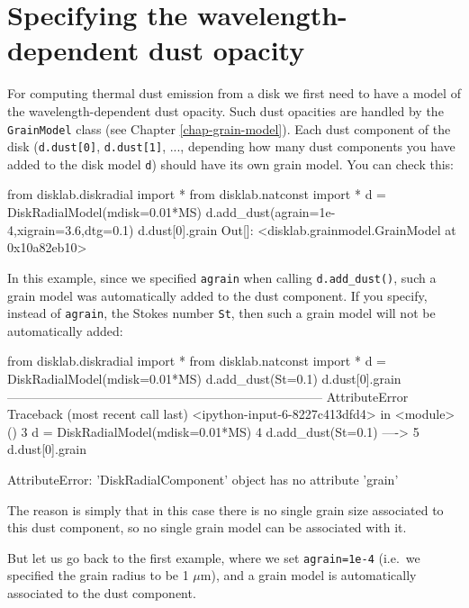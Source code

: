 \documentclass{book}
\newcommand{\code}[1]{{\small\tt #1}}
\begin{document}
\section{Specifying the wavelength-dependent dust opacity}
\label{sec-simple-dust-opacity}
For computing thermal dust emission from a disk we first need to have a model
of the wavelength-dependent dust opacity. Such dust opacities are handled by
the \code{GrainModel} class (see Chapter \ref{chap-grain-model}). Each dust
component of the disk (\code{d.dust[0]}, \code{d.dust[1]}, ..., depending how
many dust components you have added to the disk model \code{d}) should have
its own grain model. You can check this:
\begin{codebox}
from disklab.diskradial import *
from disklab.natconst import *
d = DiskRadialModel(mdisk=0.01*MS)
d.add_dust(agrain=1e-4,xigrain=3.6,dtg=0.1)
d.dust[0].grain
Out[]: <disklab.grainmodel.GrainModel at 0x10a82eb10>
\end{codebox}
In this example, since we specified \code{agrain} when calling
\code{d.add\_dust()}, such a grain model was automatically added to the dust
component. If you specify, instead of \code{agrain}, the Stokes number
\code{St}, then such a grain model will not be automatically added:
\begin{codebox}
from disklab.diskradial import *
from disklab.natconst import *
d = DiskRadialModel(mdisk=0.01*MS)
d.add_dust(St=0.1)
d.dust[0].grain
---------------------------------------------------------------------------
AttributeError                            Traceback (most recent call last)
<ipython-input-6-8227c413dfd4> in <module>()
      3 d = DiskRadialModel(mdisk=0.01*MS)
      4 d.add_dust(St=0.1)
----> 5 d.dust[0].grain

AttributeError: 'DiskRadialComponent' object has no attribute 'grain'
\end{codebox}
The reason is simply that in this case there is no single grain size associated
to this dust component, so no single grain model can be associated with it.

But let us go back to the first example, where we set \code{agrain=1e-4} (i.e.\ we
specified the grain radius to be 1 $\mu$m), and a grain model is automatically
associated to the dust component.
\end{document}
